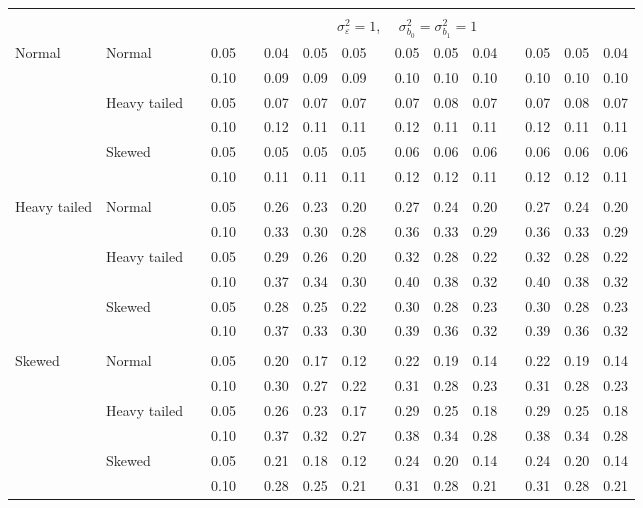 \documentclass{article} %
\begin{document}
\begin{table}[ht]
\begin{scriptsize}
\begin{center}
\begin{tabular}{ll p{.1cm} c p{.1cm} rrr p{.1cm} rrr p{.1cm} rrr}
&&&&&&&&&&&&&&&\\
& && && \multicolumn{9}{c}{$\sigma_{\varepsilon}^2 = 1$, \ \ $\sigma_{b_0}^2 = \sigma_{b_1}^2 = 1$} \\ \cline{6-16}
\rowcolor{gray!20}Normal       & Normal       && 0.05 &&   0.04 & 0.05 & 0.05 && 0.05 & 0.05 & 0.04 && 0.05 & 0.05 & 0.04 \\ 
\rowcolor{gray!20}             &              && 0.10 &&   0.09 & 0.09 & 0.09 && 0.10 & 0.10 & 0.10 && 0.10 & 0.10 & 0.10 \\ 
\rowcolor{gray!20}             & Heavy tailed && 0.05 &&   0.07 & 0.07 & 0.07 && 0.07 & 0.08 & 0.07 && 0.07 & 0.08 & 0.07 \\ 
\rowcolor{gray!20}             &              && 0.10 &&   0.12 & 0.11 & 0.11 && 0.12 & 0.11 & 0.11 && 0.12 & 0.11 & 0.11 \\ 
\rowcolor{gray!20}             & Skewed       && 0.05 &&   0.05 & 0.05 & 0.05 && 0.06 & 0.06 & 0.06 && 0.06 & 0.06 & 0.06 \\ 
\rowcolor{gray!20}             &              && 0.10 &&   0.11 & 0.11 & 0.11 && 0.12 & 0.12 & 0.11 && 0.12 & 0.12 & 0.11 \\ 
             &&&&&&&&&&&&&&&\\
Heavy tailed & Normal       && 0.05 &&   0.26 & 0.23 & 0.20 && 0.27 & 0.24 & 0.20 && 0.27 & 0.24 & 0.20 \\ 
             &              && 0.10 &&   0.33 & 0.30 & 0.28 && 0.36 & 0.33 & 0.29 && 0.36 & 0.33 & 0.29 \\ 
             & Heavy tailed && 0.05 &&   0.29 & 0.26 & 0.20 && 0.32 & 0.28 & 0.22 && 0.32 & 0.28 & 0.22 \\ 
             &              && 0.10 &&   0.37 & 0.34 & 0.30 && 0.40 & 0.38 & 0.32 && 0.40 & 0.38 & 0.32 \\ 
             & Skewed       && 0.05 &&   0.28 & 0.25 & 0.22 && 0.30 & 0.28 & 0.23 && 0.30 & 0.28 & 0.23 \\ 
             &              && 0.10 &&   0.37 & 0.33 & 0.30 && 0.39 & 0.36 & 0.32 && 0.39 & 0.36 & 0.32 \\ 
             &&&&&&&&&&&&&&&\\
Skewed       & Normal       && 0.05 &&   0.20 & 0.17 & 0.12 && 0.22 & 0.19 & 0.14 && 0.22 & 0.19 & 0.14 \\ 
             &              && 0.10 &&   0.30 & 0.27 & 0.22 && 0.31 & 0.28 & 0.23 && 0.31 & 0.28 & 0.23 \\ 
             & Heavy tailed && 0.05 &&   0.26 & 0.23 & 0.17 && 0.29 & 0.25 & 0.18 && 0.29 & 0.25 & 0.18 \\ 
             &              && 0.10 &&   0.37 & 0.32 & 0.27 && 0.38 & 0.34 & 0.28 && 0.38 & 0.34 & 0.28 \\ 
             & Skewed       && 0.05 &&   0.21 & 0.18 & 0.12 && 0.24 & 0.20 & 0.14 && 0.24 & 0.20 & 0.14 \\ 
             &              && 0.10 &&   0.28 & 0.25 & 0.21 && 0.31 & 0.28 & 0.21 && 0.31 & 0.28 & 0.21 \\ 



\end{tabular}
\end{center}
\end{scriptsize}
\end{table}
\end{document}
